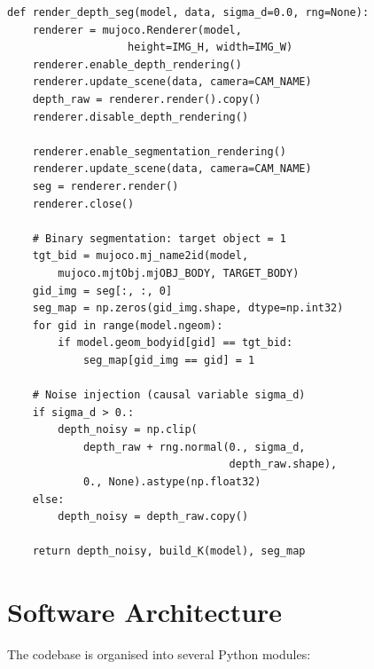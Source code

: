 \documentclass[11pt,a4paper]{report}
\begin{document}
\begin{lstlisting}[caption={Depth rendering with noise injection and segmentation.},label={lst:render}]
def render_depth_seg(model, data, sigma_d=0.0, rng=None):
    renderer = mujoco.Renderer(model,
                   height=IMG_H, width=IMG_W)
    renderer.enable_depth_rendering()
    renderer.update_scene(data, camera=CAM_NAME)
    depth_raw = renderer.render().copy()
    renderer.disable_depth_rendering()

    renderer.enable_segmentation_rendering()
    renderer.update_scene(data, camera=CAM_NAME)
    seg = renderer.render()
    renderer.close()

    # Binary segmentation: target object = 1
    tgt_bid = mujoco.mj_name2id(model,
        mujoco.mjtObj.mjOBJ_BODY, TARGET_BODY)
    gid_img = seg[:, :, 0]
    seg_map = np.zeros(gid_img.shape, dtype=np.int32)
    for gid in range(model.ngeom):
        if model.geom_bodyid[gid] == tgt_bid:
            seg_map[gid_img == gid] = 1

    # Noise injection (causal variable sigma_d)
    if sigma_d > 0.:
        depth_noisy = np.clip(
            depth_raw + rng.normal(0., sigma_d,
                                   depth_raw.shape),
            0., None).astype(np.float32)
    else:
        depth_noisy = depth_raw.copy()

    return depth_noisy, build_K(model), seg_map
\end{lstlisting}

\section{Software Architecture}
\label{sec:software_architecture}

The codebase is organised into several Python modules:
\end{document}
